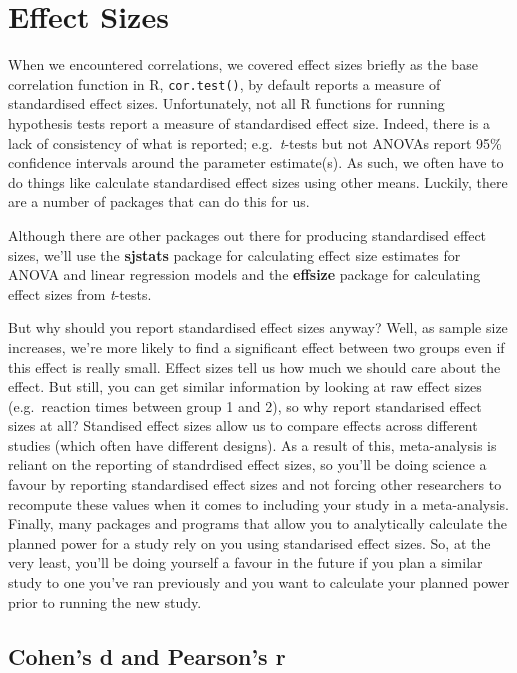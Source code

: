 \documentclass[
]{book}
\begin{document}
\hypertarget{effect-sizes-1}{%
\section{Effect Sizes}\label{effect-sizes-1}}

When we encountered correlations, we covered effect sizes briefly as the base correlation function in R, \texttt{cor.test()}, by default reports a measure of standardised effect sizes. Unfortunately, not all R functions for running hypothesis tests report a measure of standardised effect size. Indeed, there is a lack of consistency of what is reported; e.g.~\emph{t}-tests but not ANOVAs report 95\% confidence intervals around the parameter estimate(s). As such, we often have to do things like calculate standardised effect sizes using other means. Luckily, there are a number of packages that can do this for us.

Although there are other packages out there for producing standardised effect sizes, we'll use the \textbf{sjstats} package for calculating effect size estimates for ANOVA and linear regression models and the \textbf{effsize} package for calculating effect sizes from \emph{t}-tests.

But why should you report standardised effect sizes anyway? Well, as sample size increases, we're more likely to find a significant effect between two groups even if this effect is really small. Effect sizes tell us how much we should care about the effect. But still, you can get similar information by looking at raw effect sizes (e.g.~reaction times between group 1 and 2), so why report standarised effect sizes at all? Standised effect sizes allow us to compare effects across different studies (which often have different designs). As a result of this, meta-analysis is reliant on the reporting of standrdised effect sizes, so you'll be doing science a favour by reporting standardised effect sizes and not forcing other researchers to recompute these values when it comes to including your study in a meta-analysis. Finally, many packages and programs that allow you to analytically calculate the planned power for a study rely on you using standarised effect sizes. So, at the very least, you'll be doing yourself a favour in the future if you plan a similar study to one you've ran previously and you want to calculate your planned power prior to running the new study.

\hypertarget{cohens-d-and-pearsons-r}{%
\subsection{Cohen's d and Pearson's r}\label{cohens-d-and-pearsons-r}}
\end{document}
